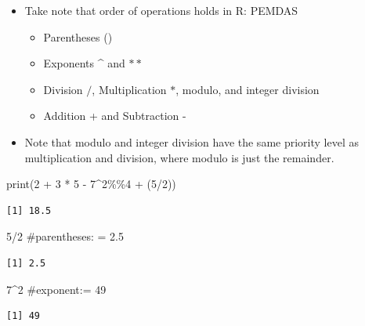 \documentclass[
  letterpaper,
  DIV=11,
  numbers=noendperiod]{scrreprt}
\newenvironment{Shaded}{\begin{snugshade}}{\end{snugshade}}
\newcommand{\CommentTok}[1]{\textcolor[rgb]{0.37,0.37,0.37}{#1}}
\newcommand{\DecValTok}[1]{\textcolor[rgb]{0.68,0.00,0.00}{#1}}
\newcommand{\FunctionTok}[1]{\textcolor[rgb]{0.28,0.35,0.67}{#1}}
\newcommand{\NormalTok}[1]{\textcolor[rgb]{0.00,0.23,0.31}{#1}}
\newcommand{\SpecialCharTok}[1]{\textcolor[rgb]{0.37,0.37,0.37}{#1}}
\providecommand{\tightlist}{%
  \setlength{\itemsep}{0pt}\setlength{\parskip}{0pt}}\usepackage{longtable,booktabs,array}
\begin{document}
\begin{itemize}
\tightlist
\item
  Take note that order of operations holds in R: PEMDAS

  \begin{itemize}
  \tightlist
  \item
    Parentheses ()
  \item
    Exponents \^{} and \(**\)
  \item
    Division \(/\), Multiplication \(*\), modulo, and integer division
  \item
    Addition + and Subtraction -
  \end{itemize}
\item
  Note that modulo and integer division have the same priority level as
  multiplication and division, where modulo is just the remainder.
\end{itemize}

\begin{Shaded}
\begin{Highlighting}[]
\FunctionTok{print}\NormalTok{(}\DecValTok{2} \SpecialCharTok{+} \DecValTok{3} \SpecialCharTok{*} \DecValTok{5} \SpecialCharTok{{-}} \DecValTok{7}\SpecialCharTok{\^{}}\DecValTok{2}\SpecialCharTok{\%\%}\DecValTok{4} \SpecialCharTok{+}\NormalTok{ (}\DecValTok{5}\SpecialCharTok{/}\DecValTok{2}\NormalTok{))}
\end{Highlighting}
\end{Shaded}

\begin{verbatim}
[1] 18.5
\end{verbatim}

\begin{Shaded}
\begin{Highlighting}[]
\DecValTok{5}\SpecialCharTok{/}\DecValTok{2}  \CommentTok{\#parentheses: = 2.5}
\end{Highlighting}
\end{Shaded}

\begin{verbatim}
[1] 2.5
\end{verbatim}

\begin{Shaded}
\begin{Highlighting}[]
\DecValTok{7}\SpecialCharTok{\^{}}\DecValTok{2}  \CommentTok{\#exponent:= 49}
\end{Highlighting}
\end{Shaded}

\begin{verbatim}
[1] 49
\end{verbatim}
\end{document}
